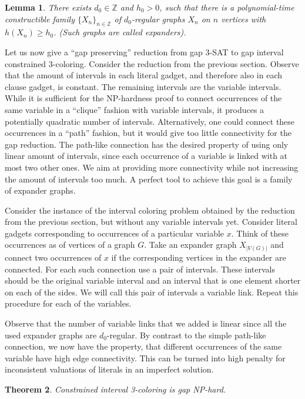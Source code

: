 \documentclass[a4paper,11pt]{article}
\providecommand{\setN}{\mathbb{Z}}
\theoremstyle{theorem}
\newtheorem{theorem}{Theorem}
\newtheorem{lemma}[theorem]{Lemma}
\begin{document}
\begin{lemma}
  There exists $d_0 \in \setN$ and $h_0 > 0$, such that there is a polynomial-time constructible family
  $\{ X_n \} _{n \in \setN}$ of $d_0$-regular graphs $X_n$ on $n$ vertices with $h(X_n) \geq h_0$. (Such graphs
  are called expanders).
\end{lemma}

Let us now give a ``gap preserving'' reduction from gap 3-SAT to 
gap interval constrained 3-coloring. Consider the reduction from the previous section.
Observe that the amount of intervals in each literal gadget, and therefore also in each clause gadget, is constant.
The remaining intervals are the variable intervals. While it is sufficient for 
the NP-hardness proof to connect occurrences of the same variable in a ``clique'' fashion with
variable intervals, it produces a potentially quadratic number of intervals.
Alternatively, one could connect these occurrences in a ``path'' fashion,
but it would give too little connectivity for the gap reduction.
The path-like connection has the desired property of using only linear amount of intervals,
since each occurrence of a variable is linked with at most two other ones.
We aim at providing more connectivity while not increasing the amount of intervals too much.
A perfect tool to achieve this goal is a family of expander graphs.

Consider the instance of the interval coloring problem obtained by the reduction
from the previous section, but without any variable intervals yet.
Consider literal gadgets corresponding to occurrences of a particular variable $x$.
Think of these occurrences as of vertices of a graph $G$. Take an expander graph $X_{|V(G)|}$ 
and connect two occurrences of $x$ if the corresponding vertices in the expander are connected. 
For each such connection use a pair of intervals. These intervals should be the
original variable interval and an interval that is one element shorter on each of the sides.
We will call this pair of intervals a variable link.
Repeat this procedure for each of the variables.

Observe that the number of variable links that we added is linear
since all the used expander graphs are $d_0$-regular.
By contrast to the simple path-like connection, we now have the property,
that different occurrences of the same variable have high edge connectivity.
This can be turned into high penalty for inconsistent valuations 
of literals in an imperfect solution.  

\begin{theorem}
Constrained interval 3-coloring is gap NP-hard.
\end{theorem}
\end{document}
